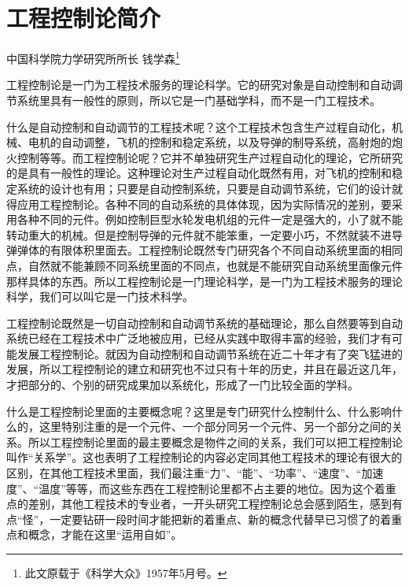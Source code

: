 
\chapter*{工程控制论简介}

\begin{flushright}
中国科学院力学研究所所长 \quad 钱学森\footnote{此文原载于《科学大众》1957年5月号。}
\end{flushright}

工程控制论是一门为工程技术服务的理论科学。它的研究对象是自动控制和自动调节系统里具有一般性的原则，所以它是一门基础学科，而不是一门工程技术。

什么是自动控制和自动调节的工程技术呢？这个工程技术包含生产过程自动化，机械、电机的自动调整，飞机的控制和稳定系统，以及导弹的制导系统，高射炮的炮火控制等等。而工程控制论呢？它并不单独研究生产过程自动化的理论，它所研究的是具有一般性的理论。这种理论对生产过程自动化既然有用，对飞机的控制和稳定系统的设计也有用；只要是自动控制系统，只要是自动调节系统，它们的设计就得应用工程控制论。各种不同的自动系统的具体体现，因为实际情况的差别，要采用各种不同的元件。例如控制巨型水轮发电机组的元件一定是强大的，小了就不能转动重大的机械。但是控制导弹的元件就不能笨重，一定要小巧，不然就装不进导弹弹体的有限体积里面去。工程控制论既然专门研究各个不同自动系统里面的相同点，自然就不能兼顾不同系统里面的不同点，也就是不能研究自动系统里面像元件那样具体的东西。所以工程控制论是一门理论科学，是一门为工程技术服务的理论科学，我们可以叫它是一门技术科学。

工程控制论既然是一切自动控制和自动调节系统的基础理论，那么自然要等到自动系统已经在工程技术中广泛地被应用，已经从实践中取得丰富的经验，我们才有可能发展工程控制论。就因为自动控制和自动调节系统在近二十年才有了突飞猛进的发展，所以工程控制论的建立和研究也不过只有十年的历史，并且在最近这几年，才把部分的、个别的研究成果加以系统化，形成了一门比较全面的学科。

什么是工程控制论里面的主要概念呢？这里是专门研究什么控制什么、什么影响什么的，这里特别注重的是一个元件、一个部分同另一个元件、另一个部分之间的关系。所以工程控制论里面的最主要概念是物件之间的关系，我们可以把工程控制论叫作“关系学”。这也表明了工程控制论的内容必定同其他工程技术的理论有很大的区别，在其他工程技术里面，我们最注重“力”、“能”、“功率”、“速度”、“加速度”、“温度”等等，而这些东西在工程控制论里都不占主要的地位。因为这个着重点的差别，其他工程技术的专业者，一开头研究工程控制论总会感到陌生，感到有点“怪”，一定要钻研一段时间才能把新的着重点、新的概念代替早已习惯了的着重点和概念，才能在这里“运用自如”。

